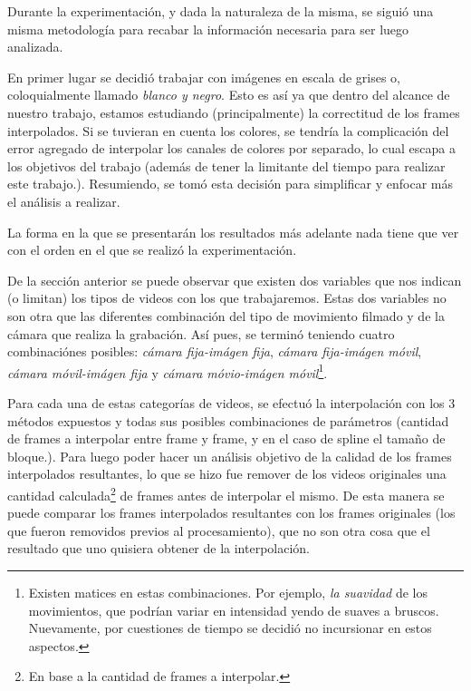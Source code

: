 Durante la experimentaci\'on, y dada la naturaleza de la misma,
se sigui\'o una misma metodolog\'ia para recabar la informaci\'on necesaria para
ser luego analizada.

\par En primer lugar se decidi\'o trabajar con im\'agenes en escala de grises o,
coloquialmente llamado \emph{blanco y negro}. Esto es as\'i ya que dentro del
alcance de nuestro trabajo, estamos estudiando (principalmente) la correctitud
de los frames interpolados. Si se tuvieran en cuenta los colores, se tendr\'ia
la complicaci\'on del error agregado de interpolar los canales de colores por
separado, lo cual escapa a los objetivos del trabajo (adem\'as de tener la
limitante del tiempo para realizar este trabajo.). Resumiendo, se tom\'o esta
decisi\'on para simplificar y enfocar m\'as el an\'alisis a realizar.

\par La forma en la que se presentar\'an los resultados m\'as adelante nada
tiene que ver con el orden en el que se realiz\'o la experimentaci\'on.

\par De la secci\'on anterior se puede observar que existen dos variables que
nos indican (o limitan) los tipos de videos con los que trabajaremos. Estas dos
variables no son otra que las diferentes combinaci\'on del tipo de movimiento
filmado y de la c\'amara que realiza la grabaci\'on. As\'i pues, se termin\'o
teniendo cuatro combinaci\'ones posibles: \emph{c\'amara fija-im\'agen fija},
\emph{c\'amara fija-im\'agen m\'ovil}, \emph{c\'amara m\'ovil-im\'agen fija} y
\emph{c\'amara m\'ovio-im\'agen m\'ovil}\footnote{Existen matices en estas
combinaciones. Por ejemplo, \emph{la suavidad} de los movimientos, que podr\'ian
variar en intensidad yendo de suaves a bruscos. Nuevamente, por cuestiones de
tiempo se decidi\'o no incursionar en estos aspectos.}.

\par Para cada una de estas categor\'ias de videos, se efectu\'o la
interpolaci\'on con los 3 m\'etodos expuestos y todas sus posibles combinaciones
de par\'ametros (cantidad de frames a interpolar entre frame y frame, y en el
caso de spline el tama\~no de bloque.). Para luego poder hacer un an\'alisis
objetivo de la calidad de los frames interpolados resultantes, lo que se hizo
fue remover de los videos originales una cantidad calculada\footnote{En base
a la cantidad de frames a interpolar.} de frames antes de interpolar el mismo.
De esta manera se puede comparar los frames interpolados resultantes con los
frames originales (los que fueron removidos previos al procesamiento), que no
son otra cosa que el resultado que uno quisiera obtener de la interpolaci\'on.

